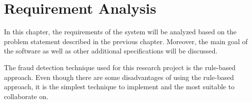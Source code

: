 \chapter{Requirement Analysis}
  \label{analysis}

  In this chapter, the requirements of the system will be analyzed based on the problem statement described in the previous chapter. Moreover, the main goal of the software as well as other additional specifications will be discussed. 

  The fraud detection technique used for this research project is the rule-based approach. Even though there are some disadvantages of using the rule-based approach, it is the simplest technique to implement and the most suitable to collaborate on. 





